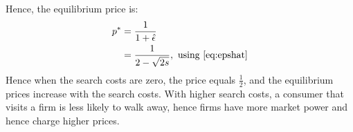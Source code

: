 \documentclass[12pt]{article}
\numberwithin{equation}{section}
\newcommand{\1}[1]{\,\mathbb{1}_{#1}} %
\begin{document}
Hence, the equilibrium price is:
\begin{align}
	p^* & =\frac{1}{1+\hat\epsilon}                            \\
	    & =\frac{1}{2-\sqrt{2s}},\text{ using \ref{eq:epshat}}
\end{align}
Hence when the search costs are zero, the price equals $\frac{1}{2}$,
and the equilibrium prices increase with the search costs. With higher search
costs, a consumer that visits a firm is less likely to walk away, hence
firms have more market power and hence charge higher prices.
\end{document}

